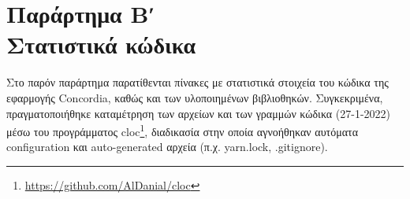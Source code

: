 \chapter*{Παράρτημα Βʹ\\[20pt]Στατιστικά κώδικα}\label{appendix-b}


\captionsetup{labelformat=AppendixBTables}
\setcounter{table}{0}

Στο παρόν παράρτημα παρατίθενται πίνακες με στατιστικά στοιχεία του κώδικα της εφαρμογής Concordia, καθώς και των υλοποιημένων βιβλιοθηκών. Συγκεκριμένα, πραγματοποιήθηκε καταμέτρηση των αρχείων και των γραμμών κώδικα (27-1-2022) μέσω του προγράμματος cloc\footnote{\url{https://github.com/AlDanial/cloc}}, διαδικασία στην οποία αγνοήθηκαν αυτόματα configuration και auto-generated αρχεία (π.χ. yarn.lock, .gitignore).

